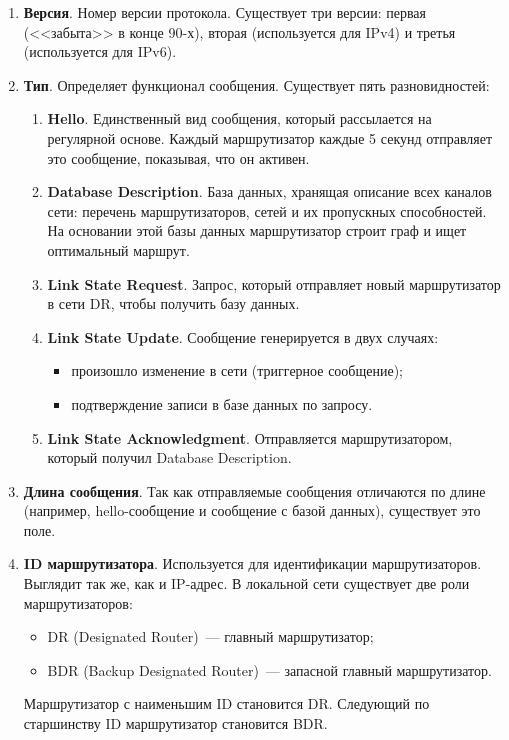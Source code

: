\begin{enumerate}
    \item \textbf{Версия}. Номер версии протокола. Существует три версии: первая (<<забыта>> в конце 90-х), вторая (используется для IPv4) и третья (используется для IPv6).
    \item \textbf{Тип}. Определяет функционал сообщения. Существует пять разновидностей:
          \begin{enumerate}
              \item \textbf{Hello}. Единственный вид сообщения, который рассылается на регулярной основе. Каждый маршрутизатор каждые 5 секунд отправляет это сообщение, показывая, что он активен.
              \item \textbf{Database Description}. База данных, хранящая описание всех каналов сети: перечень маршрутизаторов, сетей и их пропускных способностей. На основании этой базы данных маршрутизатор строит граф и ищет оптимальный маршрут.
              \item \textbf{Link State Request}. Запрос, который отправляет новый маршрутизатор в сети DR, чтобы получить базу данных.
              \item \textbf{Link State Update}. Сообщение генерируется в двух случаях:
                    \begin{itemize}
                        \item произошло изменение в сети (триггерное сообщение);
                        \item подтверждение записи в базе данных по запросу.
                    \end{itemize}
              \item \textbf{Link State Acknowledgment}. Отправляется маршрутизатором, который получил Database Description.
          \end{enumerate}
    \item \textbf{Длина сообщения}. Так как отправляемые сообщения отличаются по длине (например, hello-сообщение и сообщение с базой данных), существует это поле.
    \item \textbf{ID маршрутизатора}. Используется для идентификации маршрутизаторов. Выглядит так же, как и IP-адрес. В локальной сети существует две роли маршрутизаторов:
          \begin{itemize}
              \item DR (Designated Router)~--- главный маршрутизатор;
              \item BDR (Backup Designated Router)~--- запасной главный маршрутизатор.
          \end{itemize}
          Маршрутизатор с наименьшим ID становится DR. Следующий по старшинству ID маршрутизатор становится BDR.


\end{enumerate}
